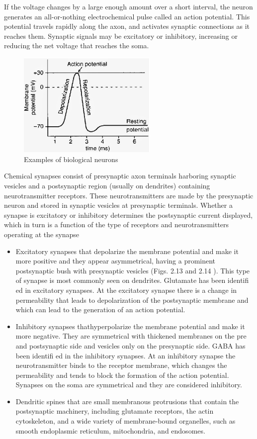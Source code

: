 If the voltage changes by a large enough amount over a short interval, 
the neuron generates an all-or-nothing electrochemical pulse called an action potential. 
This potential travels rapidly along the axon, and activates synaptic connections as it 
reaches them. Synaptic signals may be excitatory or inhibitory, 
increasing or reducing the net voltage that reaches the soma.
\begin{figure}[htb] 
	\label{fig:bio_activation}
	\centering
	\includegraphics[width=0.6\textwidth]{figures/bio_activation}
	\caption{Examples of biological neurons}
\end{figure}
Chemical synapses consist of presynaptic axon terminals harboring synaptic vesicles and a
postsynaptic region (usually on dendrites) containing neurotransmitter receptors.
These neurotransmitters are made by the presynaptic neuron and stored in synaptic vesicles at
presynaptic terminals.
Whether a synapse is excitatory or inhibitory determines the postsynaptic current displayed,
which in turn is a function of the type of receptors and neurotransmitters operating at the
synapse
\begin{itemize}
	\item Excitatory synapses that  depolarize the membrane potential and make it more positive
		and they appear asymmetrical, having a prominent postsynaptic bush with presynaptic
		vesicles (Figs. 2.13 and 2.14 ). This type of synapse is most commonly seen on dendrites. 
		Glutamate has been identifi ed in excitatory synapses. At the excitatory synapse there is
		a change in permeability that leads to depolarization of the postsynaptic membrane and
		which can lead to the generation of an action potential.
	\item Inhibitory synapses thathyperpolarize the membrane potential and make it more negative.
		They are symmetrical with thickened membranes on the pre and postsynaptic side and
		vesicles only on the presynaptic side.
		GABA has been identifi ed in the inhibitory synapses. At an inhibitory synapse the
		neurotransmitter binds to the receptor membrane, which changes the permeability and tends
		to block the formation of the action potential. Synapses on the soma are symmetrical and 
		they are considered inhibitory.
	\item  Dendritic spines that are small membranous protrusions that contain the postsynaptic 
		machinery, including glutamate receptors, the actin cytoskeleton, and a wide variety of
		membrane-bound organelles, such as smooth endoplasmic reticulum, mitochondria, 
		and endosomes.
\end{itemize}
	

